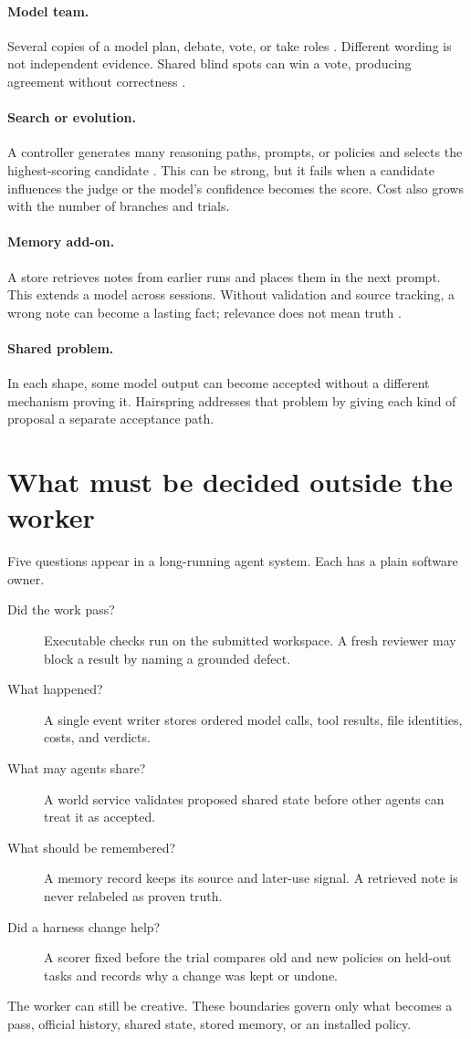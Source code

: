 \documentclass[10pt,letterpaper]{article}
\begin{document}
\paragraph{Model team.} Several copies of a model plan, debate, vote, or take roles \cite{selfconsistency}. Different wording is not independent evidence. Shared blind spots can win a vote, producing agreement without correctness \cite{consensus,cascades}.

\paragraph{Search or evolution.} A controller generates many reasoning paths, prompts, or policies and selects the highest-scoring candidate \cite{tot,treesearch,gepa}. This can be strong, but it fails when a candidate influences the judge or the model's confidence becomes the score. Cost also grows with the number of branches and trials.

\paragraph{Memory add-on.} A store retrieves notes from earlier runs and places them in the next prompt. This extends a model across sessions. Without validation and source tracking, a wrong note can become a lasting fact; relevance does not mean truth \cite{memfail}.

\paragraph{Shared problem.} In each shape, some model output can become accepted without a different mechanism proving it. Hairspring addresses that problem by giving each kind of proposal a separate acceptance path.

\section{What must be decided outside the worker}
Five questions appear in a long-running agent system. Each has a plain software owner.
\begin{description}
\item[Did the work pass?] Executable checks run on the submitted workspace. A fresh reviewer may block a result by naming a grounded defect.
\item[What happened?] A single event writer stores ordered model calls, tool results, file identities, costs, and verdicts.
\item[What may agents share?] A world service validates proposed shared state before other agents can treat it as accepted.
\item[What should be remembered?] A memory record keeps its source and later-use signal. A retrieved note is never relabeled as proven truth.
\item[Did a harness change help?] A scorer fixed before the trial compares old and new policies on held-out tasks and records why a change was kept or undone.
\end{description}
The worker can still be creative. These boundaries govern only what becomes a pass, official history, shared state, stored memory, or an installed policy.
\end{document}
